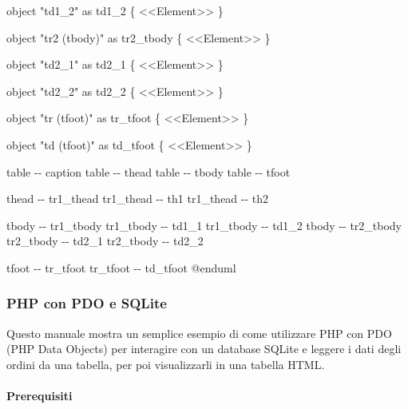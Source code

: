 \documentclass[
]{article}
\newenvironment{Shaded}{}{}
\newcommand{\NormalTok}[1]{#1}
\begin{document}
\begin{Shaded}
\begin{Highlighting}[]
\NormalTok{object "td1\_2" as td1\_2 \{}
\NormalTok{  \textless{}\textless{}Element\textgreater{}\textgreater{}}
\NormalTok{\}}

\NormalTok{object "tr2 (tbody)" as tr2\_tbody \{}
\NormalTok{  \textless{}\textless{}Element\textgreater{}\textgreater{}}
\NormalTok{\}}

\NormalTok{object "td2\_1" as td2\_1 \{}
\NormalTok{  \textless{}\textless{}Element\textgreater{}\textgreater{}}
\NormalTok{\}}

\NormalTok{object "td2\_2" as td2\_2 \{}
\NormalTok{  \textless{}\textless{}Element\textgreater{}\textgreater{}}
\NormalTok{\}}

\NormalTok{object "tr (tfoot)" as tr\_tfoot \{}
\NormalTok{  \textless{}\textless{}Element\textgreater{}\textgreater{}}
\NormalTok{\}}

\NormalTok{object "td (tfoot)" as td\_tfoot \{}
\NormalTok{  \textless{}\textless{}Element\textgreater{}\textgreater{}}
\NormalTok{\}}

\NormalTok{table {-}{-} caption}
\NormalTok{table {-}{-} thead}
\NormalTok{table {-}{-} tbody}
\NormalTok{table {-}{-} tfoot}

\NormalTok{thead {-}{-} tr1\_thead}
\NormalTok{tr1\_thead {-}{-} th1}
\NormalTok{tr1\_thead {-}{-} th2}

\NormalTok{tbody {-}{-} tr1\_tbody}
\NormalTok{tr1\_tbody {-}{-} td1\_1}
\NormalTok{tr1\_tbody {-}{-} td1\_2}
\NormalTok{tbody {-}{-} tr2\_tbody}
\NormalTok{tr2\_tbody {-}{-} td2\_1}
\NormalTok{tr2\_tbody {-}{-} td2\_2}

\NormalTok{tfoot {-}{-} tr\_tfoot}
\NormalTok{tr\_tfoot {-}{-} td\_tfoot}
\NormalTok{@enduml}
\end{Highlighting}
\end{Shaded}



\subsubsection{PHP con PDO e SQLite}\label{php-con-pdo-e-sqlite}

Questo manuale mostra un semplice esempio di come utilizzare PHP con PDO
(PHP Data Objects) per interagire con un database SQLite e leggere i
dati degli ordini da una tabella, per poi visualizzarli in una tabella
HTML.

\paragraph{Prerequisiti}\label{prerequisiti}
\end{document}

